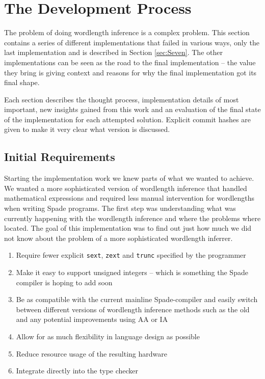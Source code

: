 \chapter{The Development Process}
\label{cha:Results}
The problem of doing wordlength inference is a complex problem. This section contains a series of different implementations that failed in various ways, only the last implementation  and is described in Section \ref{sec:Seven}. The other implementations can be seen as the road to the final implementation -- the value they bring is giving context and reasons for why the final implementation got its final shape.

Each section describes the thought process, implementation details of most important, new insights gained from this work and an evaluation of the final state of the implementation for each attempted solution. Explicit commit hashes are given to make it very clear what version is discussed.

\section{Initial Requirements}
\label{sec:initialReq}
Starting the implementation work we knew parts of what we wanted to achieve. We wanted a more sophisticated version of wordlength inference that handled mathematical expressions and required less manual intervention for wordlengths when writing Spade programs. The first step was understanding what was currently happening with the wordlength inference and where the problems where located. The goal of this implementation was to find out just how much we did not know about the problem of a more sophisticated wordlength inferrer.

\begin{enumerate}
  \label{figReq}
    \item Require fewer explicit \verb|sext|, \verb|zext| and \verb|trunc| specified by the programmer
    \item Make it easy to support unsigned integers -- which is something the Spade compiler is hoping to add soon
    \item Be as compatible with the current mainline Spade-compiler and easily switch between different versions of wordlength inference methods such as the old and any potential improvements using AA or IA
    \item Allow for as much flexibility in language design as possible
    \item Reduce resource usage of the resulting hardware
    \item Integrate directly into the type checker
\end{enumerate}

